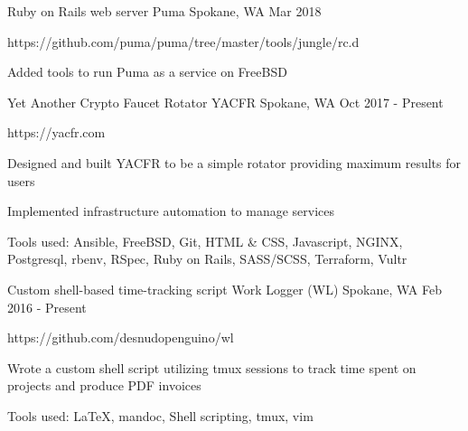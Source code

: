 

\begin{cventries}

  \cventry
    {Ruby on Rails web server} %
    {Puma} %
    {Spokane, WA} %
    {Mar 2018} %
    {
      \begin{cvitems} %
        \item {https://github.com/puma/puma/tree/master/tools/jungle/rc.d}
        \item {Added tools to run Puma as a service on FreeBSD}
      \end{cvitems}
    }

  \cventry
    {Yet Another Crypto Faucet Rotator} %
    {YACFR} %
    {Spokane, WA} %
    {Oct 2017 - Present} %
    {
      \begin{cvitems} %
        \item {https://yacfr.com}
        \item {Designed and built YACFR to be a simple rotator providing maximum results for users}
        \item {Implemented infrastructure automation to manage services}
        \item {Tools used: Ansible, FreeBSD, Git, HTML \& CSS, Javascript, NGINX, Postgresql, rbenv, RSpec, Ruby on Rails, SASS/SCSS, Terraform, Vultr}
      \end{cvitems}
    }

  \cventry
    {Custom shell-based time-tracking script} %
    {Work Logger (WL)} %
    {Spokane, WA} %
    {Feb 2016 - Present} %
    {
      \begin{cvitems} %
        \item {https://github.com/desnudopenguino/wl}
        \item {Wrote a custom shell script utilizing tmux sessions to track time spent on projects and produce PDF invoices}
        \item {Tools used: LaTeX, mandoc, Shell scripting, tmux, vim}
      \end{cvitems}
    }


\end{cventries}
